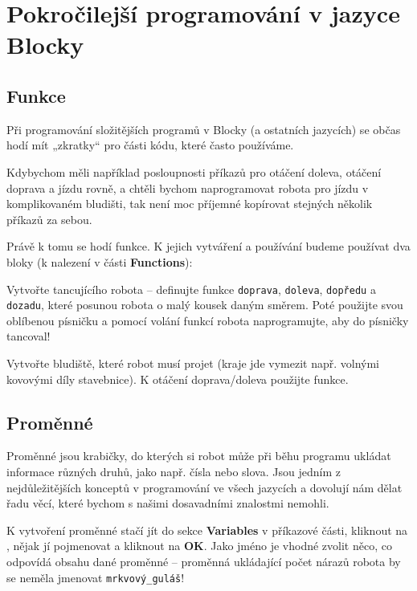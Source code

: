 \documentclass[../main.tex]{subfiles}
\begin{document}
	\section{Pokročilejší programování v jazyce Blocky}

	\subsection{Funkce}
	Při programování složitějších programů v Blocky (a ostatních jazycích) se občas hodí mít „zkratky“ pro části kódu, které často používáme.

	Kdybychom měli například posloupnosti příkazů pro otáčení doleva, otáčení doprava a jízdu rovně, a chtěli bychom naprogramovat robota pro jízdu v komplikovaném bludišti, tak není moc příjemné kopírovat stejných několik příkazů za sebou.

	Právě k tomu se hodí funkce. K jejich vytváření a používání budeme používat dva bloky (k nalezení v části \textbf{Functions}):
	\begin{itemize}
		\blockFunctionDefinition
		\blockFunctionCall
	\end{itemize}

	\begin{question}
		Vytvořte tancujícího robota -- definujte funkce \texttt{doprava}, \texttt{doleva}, \texttt{dopředu} a \texttt{dozadu}, které posunou robota o malý kousek daným směrem. Poté použijte svou oblíbenou písničku a pomocí volání funkcí robota naprogramujte, aby do písničky tancoval!
	\end{question}

	\begin{question*}
		Vytvořte bludiště, které robot musí projet (kraje jde vymezit např. volnými kovovými díly stavebnice). K otáčení doprava/doleva použijte funkce.
	\end{question*}

	\subsection{Proměnné}
	Proměnné jsou krabičky, do kterých si robot může při běhu programu ukládat informace různých druhů, jako např. čísla nebo slova. Jsou jedním z nejdůležitějších konceptů v programování ve všech jazycích a dovolují nám dělat řadu věcí, které bychom s našimi dosavadními znalostmi nemohli.

	K vytvoření proměnné stačí jít do sekce \textbf{Variables} v příkazové části, kliknout na , nějak jí pojmenovat a kliknout na \textbf{OK}. Jako jméno je vhodné zvolit něco, co odpovídá obsahu dané proměnné -- proměnná ukládající počet nárazů robota by se neměla jmenovat \texttt{mrkvový\_guláš}!
\end{document}

